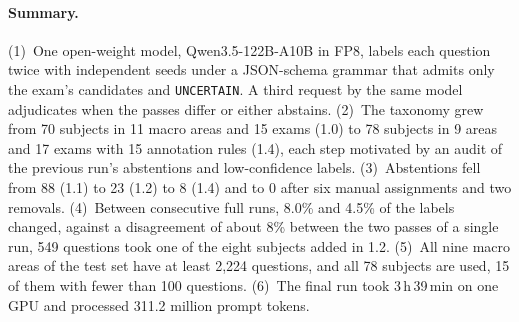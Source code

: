 \begin{table}[t]
\centering
\footnotesize
\setlength{\tabcolsep}{3.5pt}
\caption{Taxonomy versions and the runs made with each. \emph{Subj.}, \emph{Areas}, \emph{Exams}, \emph{Rules}: subjects, macro areas, exams with a candidate list and annotation rules in the version; \emph{Run}: a full run over the corpus or a run over the abstentions of the previous full run; $n$: questions; \emph{Agr.}: percentage of questions on which the two independent passes chose the same subject; \emph{Adj.}: percentage sent to adjudication; \emph{Unc.}: questions left \texttt{UNCERTAIN}. Runs 1.1 and 1.2 annotated the filtered corpus; run 1.4 annotated the 41,636 questions left after the dataset revision. Agreement is the self-consistency of one model, not accuracy.}
\label{tab:ka-short-overview}
\end{table}

\paragraph{Summary.} (1)~One open-weight model, Qwen3.5-122B-A10B in FP8,
labels each question twice with independent seeds under a JSON-schema grammar
that admits only the exam's candidates and \texttt{UNCERTAIN}. A third request
by the same model adjudicates when the passes differ or either abstains.
(2)~The taxonomy grew from 70 subjects in 11 macro areas and 15 exams (1.0) to
78 subjects in 9 areas and 17 exams with 15 annotation rules (1.4), each step
motivated by an audit of the previous run's abstentions and low-confidence
labels. (3)~Abstentions fell from 88 (1.1) to 23 (1.2) to 8 (1.4) and to 0
after six manual assignments and two removals. (4)~Between consecutive full
runs, 8.0\% and 4.5\% of the labels changed, against a disagreement of about
8\% between the two passes of a single run, 549 questions took one of the
eight subjects added in 1.2. (5)~All nine macro areas of the test set
have at least 2,224 questions, and all 78 subjects are used, 15 of them with
fewer than 100 questions. (6)~The final run took 3\,h\,39\,min on one GPU and
processed 311.2 million prompt tokens.

